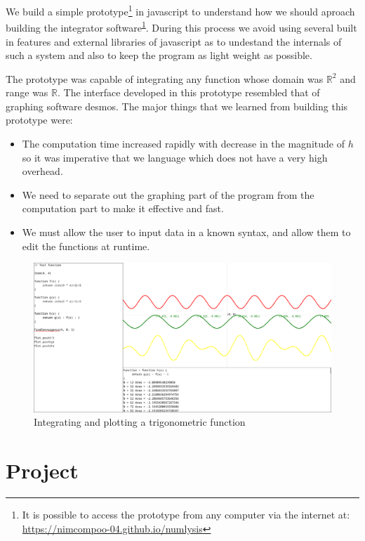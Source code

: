 \documentclass[12pt]{article}
\begin{document}
We build a simple prototype\footnote{It is possible to access the prototype from any computer via the internet at: \url{https://nimcompoo-04.github.io/numlysis}}
in javascript to understand how we should aproach building the integrator software\textsuperscript{\ref{fig:prototype1}}.
During this process we avoid using several built in features and external libraries of javascript as to undestand
the internals of such a system and also to keep the program as light weight as possible.

The prototype was capable of integrating any function whose domain was $\mathbb{R}^2$ and range was $\mathbb{R}$.
The interface developed in this prototype resembled that of graphing software desmos. The major things that we learned
from building this prototype were:
\begin{itemize}
	\item The computation time increased rapidly with decrease in the magnitude of $h$ so it was imperative that
		we language which does not have a very high overhead.

	\item We need to separate out the graphing part of the program from the computation part to make it effective and
		fast.

	\item We must allow the user to input data in a known syntax, and allow them to edit the functions at runtime.
\end{itemize}

\begin{figure}
	\includegraphics[width=\linewidth]{prototype.png}
	\caption{Integrating and plotting a trigonometric function}
	\label{fig:prototype1}
\end{figure}


\section{Project}
\end{document}
